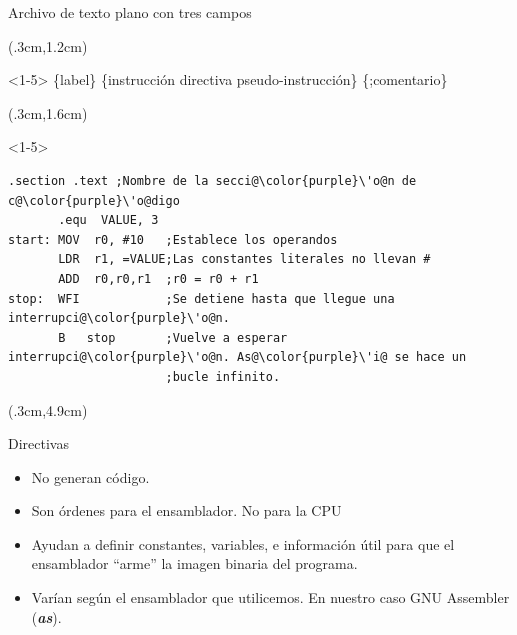\documentclass[usenames,table,dvipsnames,aspectratio=169]{beamer}
\begin{document}
\begin{frame}[fragile]{Archivo de texto plano con tres campos}
 \begin{textblock*}{\textwidth}(.3cm,1.2cm)
  \begin{onlyenv}<1-5>
   \{label\} \{instrucción \textbar directiva \textbar pseudo-instrucción\} \{;comentario\}
  \end{onlyenv}
 \end{textblock*}
 \begin{textblock*}{\textwidth}(.3cm,1.6cm)
  \begin{onlyenv}<1-5>
   \begin{lstlisting}[escapechar=\@,]
       .section .text ;Nombre de la secci@\color{purple}\'o@n de c@\color{purple}\'o@digo
       .equ  VALUE, 3     
start: MOV  r0, #10   ;Establece los operandos
       LDR  r1, =VALUE;Las constantes literales no llevan #
       ADD  r0,r0,r1  ;r0 = r0 + r1
stop:  WFI            ;Se detiene hasta que llegue una interrupci@\color{purple}\'o@n.
       B   stop       ;Vuelve a esperar interrupci@\color{purple}\'o@n. As@\color{purple}\'i@ se hace un 
                      ;bucle infinito. 
   \end{lstlisting}
  \end{onlyenv}
 \end{textblock*}
 \begin{textblock*}{\textwidth}(.3cm,4.9cm)
  \begin{block}{Directivas}
   \begin{itemize}[<+(1)->] \justifying
    \item No generan código.
    \item Son órdenes para el ensamblador. No para la CPU
    \item Ayudan a definir constantes, variables, e información útil para que el ensamblador ``arme'' la imagen binaria del programa. 
    \item Varían según el ensamblador que utilicemos. En nuestro caso GNU Assembler (\textbf{\textit{as}}).
   \end{itemize}
  \end{block}
 \end{textblock*}
\end{frame}
\end{document}
